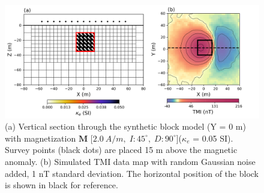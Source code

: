 \documentclass[paper]{geophysics}
\begin{document}
\begin{figure}[p!]
\includegraphics[width=\columnwidth]{Figures/Figure1.png}
\caption{(a) Vertical section through the synthetic block model (Y = 0 m) with magnetization $\mathbf{M}$ [$2.0\: A/m,\; I: 45^\circ,\; D: 90^\circ$]($\kappa_e$ = 0.05 SI). Survey points (black dots) are placed 15 m above the magnetic anomaly. (b) Simulated TMI data map with random Gaussian noise added, 1 nT standard deviation. The horizontal position of the block is shown in black for reference.}
\label{REM_model}
\end{figure}
\end{document}
